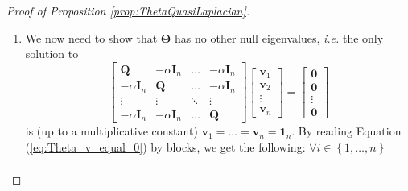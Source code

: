\documentclass[12pt]{article}
\theoremstyle{plain}
\theoremstyle{remark}
\newcommand{\round}[1]{\left( #1 \right)}
\newcommand{\curly}[1]{\left\{ #1 \right\}}
\newcommand{\onen}[0]{{\mathbf{1}_{n}}}
\newcommand{\ie}{\textit{i.e. }}
\newcommand{\dVec}[1]{{\bm{#1}}}            %
\newcommand{\latMatr}[1]{\mathbf{#1}}          %
\newcommand{\grMatr}[1]{{\boldsymbol{#1}}}   %
\begin{document}
\begin{proof}[Proof of Proposition \ref{prop:ThetaQuasiLaplacian}]
\begin{enumerate}
            \item We now need to show that $\grMatr{\Theta}$ has no other null eigenvalues, \ie the only solution to 
            \begin{equation}
                \label{eq:Theta_v_equal_0}
                \begin{bmatrix}
    			\latMatr{Q} & -\alpha \latMatr{I}_n & \dots & -\alpha \latMatr{I}_n\\
    			-\alpha \latMatr{I}_n & \latMatr{Q} & \dots & -\alpha \latMatr{I}_n\\
    			\vdots & \vdots & \ddots & \vdots\\
    			-\alpha \latMatr{I}_n & -\alpha \latMatr{I}_n & \dots & \latMatr{Q}
    		\end{bmatrix} \begin{bmatrix}
    		    \dVec v_1\\
                \dVec v_2\\
                \vdots\\
                \dVec v_n
    		\end{bmatrix} = \begin{bmatrix}
    		    \dVec 0 \\
                \dVec 0 \\
                \vdots\\
                \dVec 0
    		\end{bmatrix}
            \end{equation}
            is (up to a multiplicative constant) $\dVec v_1=\dots=\dVec v_n=\onen$. By reading Equation (\ref{eq:Theta_v_equal_0}) by blocks, we get the following:  $\forall i \in \curly{1,\dots,n}$
            \begin{align*}

\end{align*}
\end{enumerate}
\end{proof}
\end{document}

